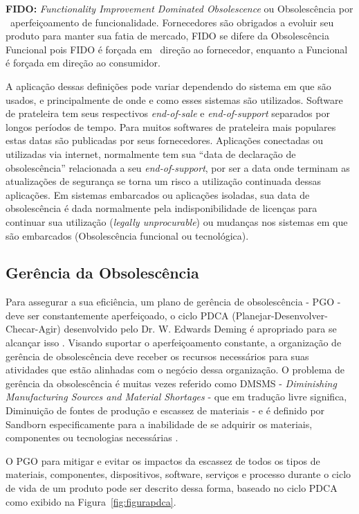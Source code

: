 \textbf{FIDO:} \textit{Functionality Improvement Dominated Obsolescence} ou Obsolescência por ~aperfeiçoamento de funcionalidade.
Fornecedores são obrigados a evoluir seu produto para manter sua fatia de mercado, FIDO se difere da Obsolescência Funcional pois FIDO é forçada em ~direção ao  fornecedor, enquanto a Funcional é forçada em direção ao consumidor.

A aplicação dessas definições pode variar dependendo do sistema em que são usados, e principalmente de onde e como esses sistemas são utilizados. Software de prateleira tem seus respectivos \textit{end-of-sale} e \textit{end-of-support} separados por longos períodos de tempo. Para muitos softwares de prateleira mais populares estas datas são publicadas por seus fornecedores. Aplicações conectadas ou utilizadas via internet, normalmente tem sua “data de declaração de obsolescência” relacionada a seu \textit{end-of-support}, por ser a data onde terminam as atualizações de segurança se torna um risco a utilização continuada dessas aplicações. Em sistemas embarcados ou aplicações isoladas, sua data de obsolescência é dada normalmente pela indisponibilidade de licenças para continuar sua utilização (\textit{legally unprocurable}) ou mudanças nos sistemas em que são embarcados (Obsolescência funcional ou tecnológica).

\subsection{\esp Gerência da Obsolescência}
Para assegurar a sua eficiência, um plano de gerência de obsolescência - PGO - deve ser constantemente aperfeiçoado, o ciclo PDCA (Planejar-Desenvolver-Checar-Agir) desenvolvido pelo Dr. W. Edwards Deming é apropriado para se alcançar isso \cite{sandborn2012}.
Visando suportar o aperfeiçoamento constante, a organização de gerência de obsolescência deve receber os recursos necessários para suas atividades que estão alinhadas com o negócio dessa organização. O problema de gerência da obsolescência é muitas vezes referido como DMSMS - \textit{Diminishing Manufacturing Sources and Material Shortages} - que em tradução livre significa, Diminuição de fontes de produção e escassez de materiais - e é definido por Sandborn especificamente para a inabilidade de se adquirir os materiais, componentes ou tecnologias necessárias \cite{sandborn2012}.

O PGO para mitigar e evitar os impactos da escassez de todos os tipos de materiais, componentes, dispositivos, software, serviços e processo durante o ciclo de vida de um produto pode ser descrito dessa forma, baseado no ciclo PDCA como exibido na Figura~\ref{fig:figurapdca}.

